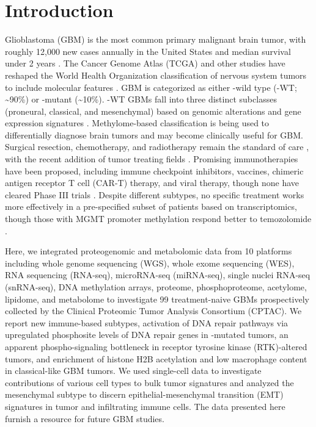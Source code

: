 \section{Introduction}
Glioblastoma (GBM) is the most common primary malignant brain tumor, with roughly 12,000 new cases annually in the United States and median survival under 2 years \cite{delgado-lopezpd_corrales-garciaem:SurvivalGlioblastoma2016,ostromqt_barnholtz-sloanjs:CBTRUSStatistical2019}. The Cancer Genome Atlas (TCGA) \cite{brennancw_chinl:GBM2013,tcga_network:GBM2008} and other studies \cite{yanh_bignerdd:IDH1IDH22009} have reshaped the World Health Organization classification of nervous system tumors \cite{louisdn_ellisondw:2016World2016} to include molecular features \cite{bratdj_wellerm:CIMPACTNOWUpdate2018, louisdn_vondeimlinga:AnnouncingCIMPACTNOW2017}.
GBM is categorized as either -wild type (-WT; \textasciitilde90\%) or -mutant (\textasciitilde10\%). -WT GBMs fall into three distinct subclasses (proneural, classical, and mesenchymal) based on genomic alterations and gene expression signatures \cite{verhaakrgw_hayesdn:IntegratedGenomic2010,wangq_verhaakrgw:TumorEvolution2017}. Methylome-based classification is being used to differentially diagnose brain tumors \cite{karimis_zadehg:CentralNervous2019,nassirif_aldapekd:DNAMethylation2019} and may become clinically useful for GBM.
Surgical resection, chemotherapy, and radiotherapy remain the standard of care \cite{stuppr_mirimanoffro:RadiotherapyConcomitant2005,perryjr_trialinvestigators:ShortCourseRadiation2017}, with the recent addition of tumor treating fields \cite{stuppr_ramz:EffectTumorTreating2017}.
Promising immunotherapies have been proposed, including immune checkpoint inhibitors, vaccines, chimeric antigen receptor T cell (CAR-T) therapy, and viral therapy, though none have cleared Phase III trials \cite{limm_wellerm:CurrentState2018,mcgranahant_nagpals:CurrentState2019}.
Despite different subtypes, no specific treatment works more effectively in a pre-specified subset of patients based on transcriptomics, though those with MGMT promoter methylation respond better to temozolomide \cite{stuppr_mirimanoffro:RadiotherapyConcomitant2005}.

Here, we integrated proteogenomic and metabolomic data from 10 platforms including whole genome sequencing (WGS), whole exome sequencing (WES), RNA sequencing (RNA-seq), microRNA-seq (miRNA-seq), single nuclei RNA-seq (snRNA-seq), DNA methylation arrays, proteome, phosphoproteome, acetylome, lipidome, and metabolome to investigate 99 treatment-naive GBMs prospectively collected by the Clinical Proteomic Tumor Analysis Consortium (CPTAC). We report new immune-based subtypes, activation of DNA repair pathways via upregulated phosphosite levels of DNA repair genes in -mutated tumors, an apparent phospho-signaling bottleneck in receptor tyrosine kinase (RTK)-altered tumors, and enrichment of histone H2B acetylation and low macrophage content in classical-like GBM tumors. We used single-cell data to investigate contributions of various cell types to bulk tumor signatures and analyzed the mesenchymal subtype to discern epithelial-mesenchymal transition (EMT) signatures in tumor and infiltrating immune cells. The data presented here furnish a resource for future GBM studies.
